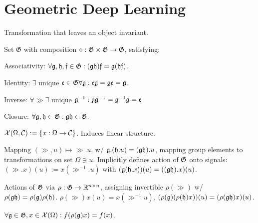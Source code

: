 \section{Geometric Deep Learning}

\begin{definition}[Symmetry]
    Transformation that leaves an object invariant.
\end{definition}

\begin{definition}[Group]
    Set \(\mathfrak{G}\) with composition \(\circ: \mathfrak{G} \times \mathfrak{G} \to \mathfrak{G}\), satisfying:
    \begin{itemize*}
        \item Associativity: \(\forall \mathfrak{g}, \mathfrak{h}, \mathfrak{f} \in \mathfrak{G}: (\mathfrak{g}\mathfrak{h})\mathfrak{f} = \mathfrak{g}(\mathfrak{h}\mathfrak{f})\).
        \item Identity: \(\exists\) unique \(\mathfrak{e} \in \mathfrak{G} \forall \mathfrak{g}: \mathfrak{e}\mathfrak{g} = \mathfrak{g}\mathfrak{e} = \mathfrak{g}\).
        \item Inverse: \(\forall \gg \exists\) unique \(\mathfrak{g}^{-1}: \mathfrak{g}\mathfrak{g}^{-1} = \mathfrak{g}^{-1}\mathfrak{g} = \mathfrak{e}\)
        \item Closure: \(\forall \mathfrak{g}, \mathfrak{h} \in \mathfrak{G}: \mathfrak{g}\mathfrak{h} \in \mathfrak{G}\).
    \end{itemize*}
\end{definition}

\begin{definition}
    \(\operatorname{\mathcal{X}}(\Omega, \mathcal{C}) := \{x: \Omega \to \mathcal C\}\). Induces linear structure.
\end{definition}

\begin{definition}[Action]
    Mapping \((\gg, u) \mapsto \gg.u\), w/ \(\mathfrak{g}.(\mathfrak{h}.u) = (\mathfrak{g}\mathfrak{h}).u\), mapping group elements to transformations on set \(\Omega \ni u\). Implicitly defines action of \(\G\) onto signals: \((\gg.x)(u) := x(\gg^{-1}.u)\) with \((\mathfrak{g}(\mathfrak{h}.x))(u) = ((\mathfrak{g}\mathfrak{h}).x)(u)\).
\end{definition}

\begin{definition}[Representation]
    Actions of \(\G\) via \(\rho: \mathfrak{G} \to \mathbb{R}^{n \times n}\), assigning invertible \(\rho(\gg)\) w/ \(\rho(\mathfrak{g}\mathfrak{h}) = \rho(\mathfrak{g}) \rho(\mathfrak{h})\). \(\rho(\gg)x(u) = x(\gg^{-1} u)\), \((\rho(\mathfrak{g})(\rho(\mathfrak{h})x))(u) = (\rho(\mathfrak{g}\mathfrak{h})x)(u)\).
\end{definition}

\begin{definition}[\(\G\)-invariance]
    \(\forall \mathfrak{g} \in \mathfrak{G}, x\in\operatorname{\mathcal{X}}(\Omega): f(\rho(\mathfrak{g})x) = f(x)\).
\end{definition}

